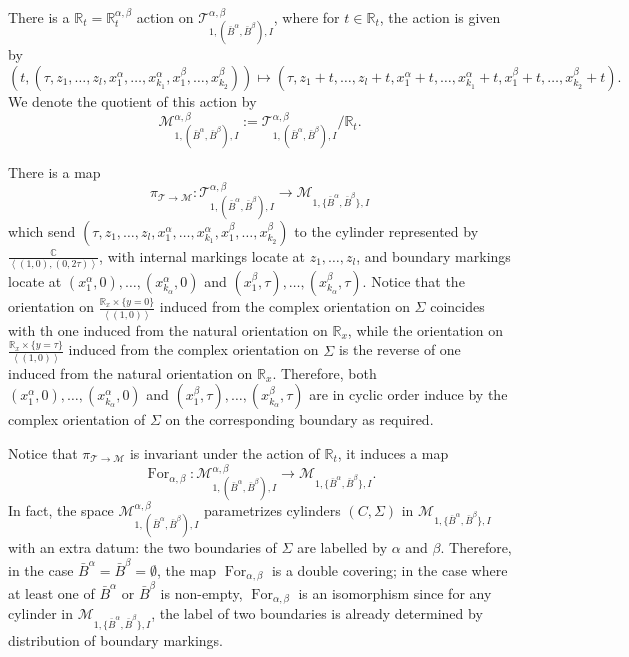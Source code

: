 \documentclass[11pt,a4paper]{article}
\theoremstyle{definition}
\theoremstyle{remark}
\numberwithin{equation}{section}
\begin{document}
There is a $\mathbb R_t=\mathbb R_t^{\alpha,\beta}$ action on $\mathcal T^{\alpha,\beta}_{1,(\bar{B}^\alpha,\bar{B}^\beta),I}$, where for $t\in \mathbb R_t$, the action is given by
$$
\left(t,(\tau,z_1,\dots,z_l,x^\alpha_1,\dots,x^\alpha_{k_1},x^\beta_1,\dots,x^\beta_{k_2})\right)\mapsto(\tau,z_1+t,\dots,z_l+t,x^\alpha_1+t,\dots,x^\alpha_{k_1}+t,x^\beta_1+t,\dots,x^\beta_{k_2}+t).
$$
We denote the quotient of this action by
$$
\mathcal M^{\alpha,\beta}_{1,(\bar{B}^\alpha,\bar{B}^\beta),I}:=\mathcal T^{\alpha,\beta}_{1,(\bar{B}^\alpha,\bar{B}^\beta),I}\big/ \mathbb R_t.
$$








There is a map 
$$
\pi_{\mathcal T \to \mathcal M}\colon \mathcal T^{\alpha,\beta}_{1,(\bar{B}^\alpha,\bar{B}^\beta),I}\to \mathcal M_{1,\{\bar{B}^\alpha,\bar{B}^\beta\},I}
$$ which send $(\tau,z_1,\dots,z_l,x^\alpha_1,\dots,x^\alpha_{k_1},x^\beta_1,\dots,x^\beta_{k_2})$ to the cylinder represented by $\frac{\mathbb C}{\left<(1,0),(0,2\tau)\right>}$, with internal markings locate at $z_1,\dots,z_l$, and boundary markings locate at $(x^\alpha_1,0),\dots,(x^\alpha_{k_\alpha},0)$ and $(x^\beta_1,\tau),\dots,(x^\beta_{k_\alpha},\tau)$. Notice that the orientation on $\frac{\mathbb R_x\times \{y=0\}}{\left< (1,0)\right>}$ induced from the complex orientation on $\Sigma$ coincides with th one induced from the natural orientation on $\mathbb R_x$, while the orientation on $\frac{\mathbb R_x\times \{y=\tau\}}{\left< (1,0)\right>}$ induced from the complex orientation on $\Sigma$ is the reverse of one induced from the natural orientation on $\mathbb R_x$. Therefore, both  $(x^\alpha_1,0),\dots,(x^\alpha_{k_\alpha},0)$ and $(x^\beta_1,\tau),\dots,(x^\beta_{k_\alpha},\tau)$ are in cyclic order induce by the complex orientation of $\Sigma$ on the corresponding boundary as required.

Notice that $\pi_{\mathcal T \to \mathcal M}$ is invariant under the action of $\mathbb R_t$, it induces a map $$\operatorname{For}_{\alpha,\beta}\colon \mathcal M^{\alpha,\beta}_{1,(\bar{B}^\alpha,\bar{B}^\beta),I}\to \mathcal M_{1,\{\bar{B}^\alpha,\bar{B}^\beta\},I}.$$
In fact, the space $ \mathcal M^{\alpha,\beta}_{1,(\bar{B}^\alpha,\bar{B}^\beta),I}$ parametrizes cylinders $(C,\Sigma)$ in $ \mathcal M_{1,\{\bar{B}^\alpha,\bar{B}^\beta\},I}$ with an extra datum: the two boundaries  of $\Sigma$ are labelled by $\alpha$ and $\beta$. Therefore, in the case $\bar{B}^\alpha=\bar{B}^\beta=\emptyset$, the map $\operatorname{For}_{\alpha,\beta}$ is a double covering; in the case where at least one of $\bar{B}^\alpha$ or $\bar{B}^\beta$ is non-empty, $\operatorname{For}_{\alpha,\beta}$ is an isomorphism since for any cylinder in $ \mathcal M_{1,\{\bar{B}^\alpha,\bar{B}^\beta\},I}$, the label of two boundaries is already determined by distribution of boundary markings.
\end{document}
